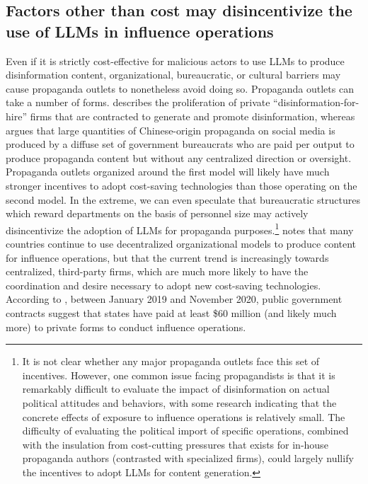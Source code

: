 \documentclass{article}
\begin{document}
\subsection{Factors other than cost may disincentivize the use of LLMs in influence operations}
\label{sec:bureaucracy}

Even if it is strictly cost-effective for malicious actors to use LLMs to produce disinformation content, organizational, bureaucratic, or cultural barriers may cause propaganda outlets to nonetheless avoid doing so. Propaganda outlets can take a number of forms. \cite{fisher} describes the proliferation of private ``disinformation-for-hire'' firms that are contracted to generate and promote disinformation, whereas \cite{king} argues that large quantities of Chinese-origin propaganda on social media is produced by a diffuse set of government bureaucrats who are paid per output to produce propaganda content but without any centralized direction or oversight. Propaganda outlets organized around the first model will likely have much stronger incentives to adopt cost-saving technologies than those operating on the second model. In the extreme, we can even speculate that bureaucratic structures which reward departments on the basis of personnel size may actively disincentivize the adoption of LLMs for propaganda purposes.\footnote{It is not clear whether any major propaganda outlets face this set of incentives. However, one common issue facing propagandists is that it is remarkably difficult to evaluate the impact of disinformation on actual political attitudes and behaviors, with some research indicating that the concrete effects of exposure to influence operations is relatively small. \cite{nature} The difficulty of evaluating the political import of specific operations, combined with the insulation from cost-cutting pressures that exists for in-house propaganda authors (contrasted with specialized firms), could largely nullify the incentives to adopt LLMs for content generation.} \cite{oii} notes that many countries continue to use decentralized organizational models to produce content for influence operations, but that the current trend is increasingly towards centralized, third-party firms, which are much more likely to have the coordination and desire necessary to adopt new cost-saving technologies. According to \cite{oii}, between January 2019 and November 2020, public government contracts suggest that states have paid at least \$60 million (and likely much more) to private forms to conduct influence operations. 
\end{document}
